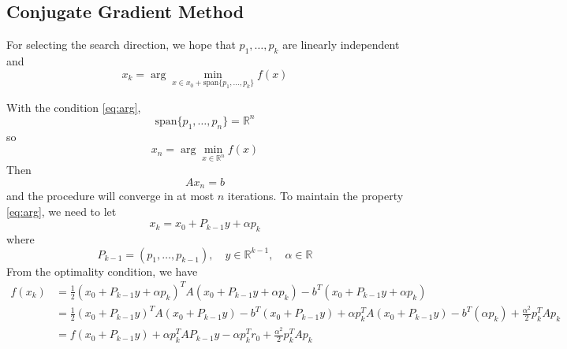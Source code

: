 \subsection{Conjugate Gradient Method}

For selecting the search direction, we hope that $p_1, \ldots, p_k$ are linearly independent and \begin{equation}
    x_k = \arg \min_{x \in x_0 + \text{span}\{p_1, \ldots, p_k\}} f(x) \label{eq:arg}
\end{equation}

With the condition \ref{eq:arg}, \[
    \mbox{span}\{p_1, \ldots, p_n\} = \mathbb{R}^n
\]
so \[
    x_n = \arg \min_{x \in \mathbb{R}^n} f(x)
\]
Then \[
    Ax_n = b
\]
and the procedure will converge in at most $n$ iterations. To maintain the property \ref{eq:arg}, we need to let \[
    x_k = x_0 + P_{k-1} y + \alpha p_k
\]
where \[
    P_{k-1} = (p_1, \ldots, p_{k-1}), \quad y \in \mathbb{R}^{k-1}, \quad \alpha \in \mathbb{R}
\]
From the optimality condition, we have \begin{align*}
    f(x_k) &= \frac{1}{2} (x_0 + P_{k-1} y + \alpha p_k)^T A (x_0 + P_{k-1} y + \alpha p_k) - b^T (x_0 + P_{k-1} y + \alpha p_k) \\
    &= \frac{1}{2} (x_0 + P_{k-1} y)^T A (x_0 + P_{k-1} y) - b^T (x_0 + P_{k-1} y) + \alpha p_k^T A (x_0 + P_{k-1} y) - b^T (\alpha p_k)+ \frac{\alpha^2}{2}  p_k^T A p_k \\ 
    &= f(x_0 + P_{k-1} y) + \alpha p_k^T A P_{k-1} y - \alpha p_k^T r_0 + \frac{\alpha^2}{2} p_k^T A p_k
\end{align*}

